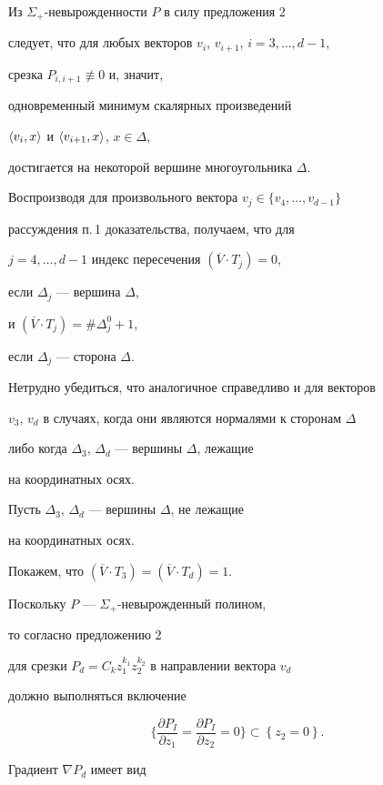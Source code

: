 \begin{pf}
Из $\Sigma_+$-невырожденности $P$ в силу предложения 2


следует, что для любых векторов $v_i$, $v_{i+1}$, $i=3,\dotsc, d-1$,


срезка $P_{i,i+1}\not\equiv 0$ и, значит,


одновременный минимум скалярных произведений


$\langle v_i,x\rangle$ и $\langle v_{i+1},x\rangle$, $x\in\Delta$,


достигается на некоторой вершине многоугольника $\Delta$.


Воспроизводя для произвольного вектора $v_j\in\{v_4,\dotsc,v_{d-1}\}$


рассуждения п.\,1 доказательства, получаем, что для


$j=4,\dotsc,d-1$ индекс пересечения $(\overline V\cdot T_{j})=0$,


если $\Delta_j$ --- вершина $\Delta$,


и $(\overline V\cdot T_{j})=\#\Delta^0_j+1$,


если $\Delta_j$ --- сторона $\Delta$.


Нетрудно убедиться, что аналогичное справедливо и для векторов


$v_3$, $v_d$ в случаях, когда они являются нормалями к сторонам $\Delta$


либо когда $\Delta_3$, $\Delta_d$ --- вершины $\Delta$, лежащие


на координатных осях.





Пусть $\Delta_3$, $\Delta_d$ --- вершины $\Delta$, не лежащие


на координатных осях.


Покажем, что $(\overline V\cdot T_{3})=(\overline V\cdot T_{d})=1$.


Поскольку $P$ --- $\Sigma_+$-невырожденный полином,


то согласно предложению 2


для срезки $P_d=C_k z_1^{k_1}z_2^{k_2}$ в направлении вектора $v_d$


должно выполняться включение


$$


\bigg\{ \frac{\partial P_I}{\partial z_1} =


\frac{\partial P_I}{\partial z_2} =0 \bigg\} \subset


\left \{z_2=0\right \}.


$$


Градиент $\nabla P_d$ имеет вид



\end{pf}
